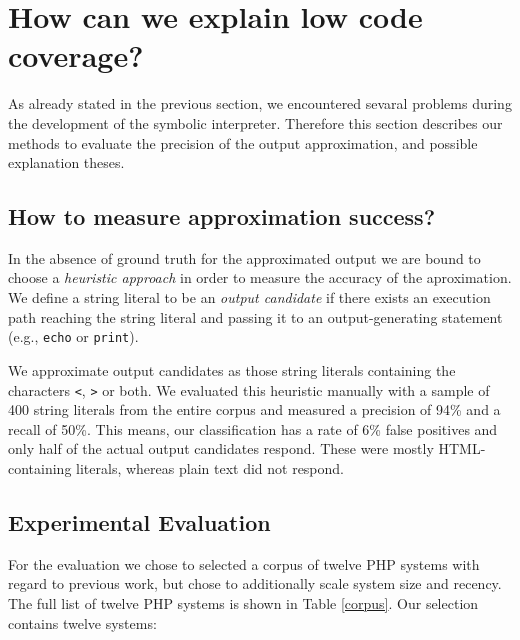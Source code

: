 \documentclass{sig-alternate-05-2015}
\begin{document}
\section{How can we explain low code coverage?}
As already stated in the previous section, we encountered sevaral problems
during the development of the symbolic interpreter. Therefore this section
describes our methods to evaluate the precision of the output approximation, and
possible explanation theses.

\subsection{How to measure approximation success?} \label{heuristic}
In the absence of ground truth for the approximated output we
are bound to choose a \emph{heuristic approach} in order to measure the accuracy
of the aproximation. We define a string literal to be an \emph{output candidate} if there exists an
execution path reaching the string literal and passing it to an 
output-generating statement (e.g., \texttt{echo} or \texttt{print}).

We approximate output candidates as those string literals containing the
characters \texttt{<}, \texttt{>} or both. We evaluated this heuristic manually
with a sample of 400 string literals from the entire corpus and measured a
precision of 94\% and a recall of 50\%. This means, our classification has a
rate of 6\% false positives and only half of the actual output candidates
respond. These were mostly HTML-containing literals, whereas plain text did not
respond. 

\subsection{Experimental Evaluation} 
For the evaluation we chose to selected a corpus of twelve PHP systems with regard to
previous work, but chose to additionally scale system size and recency. The full list of twelve PHP systems is shown in Table \ref{corpus}. Our selection contains
twelve systems:
\end{document}
